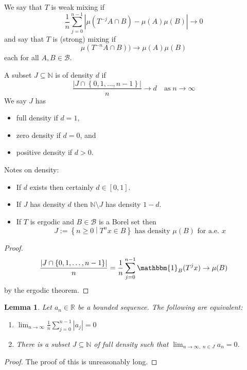 \documentclass[11pt]{article}
\newcommand{\defeq}{:=}
\newcommand{\abs}[1]{\left|#1\right|}
\newcommand{\indic}[1]{\mathbbm{1}_{#1}}
\newcommand{\relmiddle}[1]{\mathrel{}\middle#1\mathrel{}}
\newcommand{\rmv}{\relmiddle|}
\newcommand{\R}{\mathbb{R}}
\newcommand{\N}{\mathbb{N}}
\newenvironment{defin}
	{\begin{mdframed}[backgroundcolor=white, roundcorner=5pt, linewidth=1pt]}
	{\end{mdframed}}
\newcommand{\mdf}[1]{{\color{red} #1}}
\newtheorem{lemma}[prop]{Lemma}
\begin{document}
\begin{defin}
	We say that $T$ is \mdf{weak mixing} if
	\[
		\frac{1}{n}\sum_{j=0}^{n-1}\abs{\mu(T^{-j}A\cap B) - \mu(A)\mu(B)} \to 0
	\]
	and say that $T$ is \mdf{(strong) mixing} if
	\[
		\mu(T^{-n}A\cap B)) \to \mu(A)\mu(B)
	\]
	each for all $A, B\in\mathcal{B}$.

	A subset $J\subseteq \N$ is of \mdf{density $d$} if
	\[
		\frac{\abs{J\cap \left\{ 0, 1, \dots , n-1\right\}}}{n}\to d\quad \text{as} \; n\to\infty
	\]
	We say $J$ has
	\begin{itemize}
		\item \mdf{full density} if $d=1$,
		\item \mdf{zero density} if $d=0$, and
		\item \mdf{positive density} if $d>0$.
	\end{itemize}
\end{defin}

Notes on density:
\begin{itemize}
	\item If $d$ exists then certainly $d\in \left[ 0, 1\right]$.
	\item If $J$ has density $d$ then $\N \setminus J$ has density $1-d$.
	\item If $T$ is ergodic and $B\in\mathcal{B}$ is a Borel set then
		\[
			J\defeq\left\{ n \geq 0 \rmv T^n x \in B\right\}\text{ has density }\mu(B) \text{ for a.e. }x
		\]
\end{itemize}

\begin{proof}
\[
	\frac{\abs{J\cap \left\{ 0, 1, \dots, n-1\right\}}}{n}= \frac{1}{n}\sum_{j=0}^{n-1}\indic{B}(T^j x) \to \mu(B)
\]
by the ergodic theorem.
\end{proof}

\begin{lemma}
Let $a_n\in\R$ be a bounded sequence.
The following are equivalent:
\begin{enumerate}
	\item $\lim_{n\to\infty}\frac{1}{n}\sum_{j=0}^{n-1}\abs{a_j} = 0$
	\item There is a subset $J\subseteq\N$ of full density such that $\lim_{n\to\infty, \; n\in J}a_n =0$.
\end{enumerate}
\end{lemma}

\begin{proof}
The proof of this is unreasonably long.
\end{proof}
\end{document}
